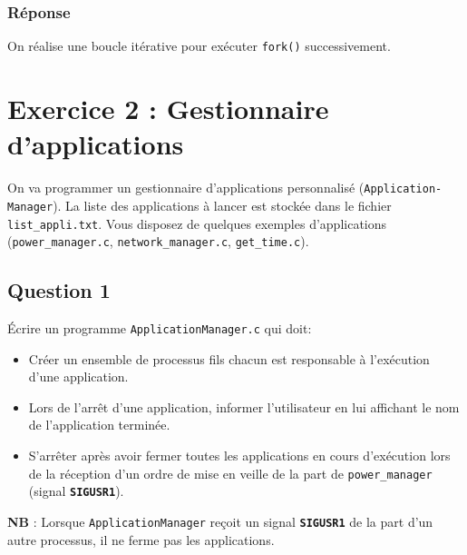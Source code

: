 \documentclass[
	12pt, %
]{fphw}
\begin{document}
\subsubsection*{Réponse}

On réalise une boucle itérative pour exécuter \texttt{fork()} successivement. 

\section*{Exercice 2 : Gestionnaire d'applications}
On va programmer un gestionnaire d'applications personnalisé (\texttt{Application-Manager}). La liste des applications à lancer est stockée dans le fichier \texttt{list\_appli.txt}. Vous disposez de quelques exemples d'applications (\texttt{power\_manager.c}, \texttt{network\_manager.c}, \texttt{get\_time.c}).

\subsection*{Question 1}
Écrire un programme \texttt{ApplicationManager.c} qui doit:
\begin{itemize}
	\item Créer un ensemble de processus fils chacun est responsable à l'exécution d'une application.
	\item Lors de l'arrêt d'une application, informer l'utilisateur en lui affichant le nom de l'application terminée.
	\item S'arrêter après avoir fermer toutes les applications en cours d'exécution lors de la réception d'un ordre de mise en veille de la part de \texttt{power\_manager} (signal \texttt{\textbf{SIGUSR1}}).
\end{itemize}
\textbf{NB} : Lorsque \texttt{ApplicationManager} reçoit un signal \texttt{\textbf{SIGUSR1}} de la part d'un autre processus, il ne ferme pas les applications.
\end{document}

